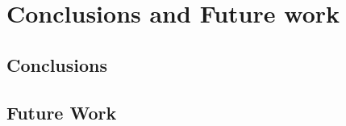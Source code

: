 \chapter{Conclusions and Future work}

\ifpdf
    \graphicspath{{Chapter3/Figs/Raster/}{Chapter3/Figs/PDF/}{Chapter3/Figs/}}
\else
    \graphicspath{{Chapter3/Figs/Vector/}{Chapter3/Figs/}}
\fi

\section{Conclusions}
\section{Future Work}


